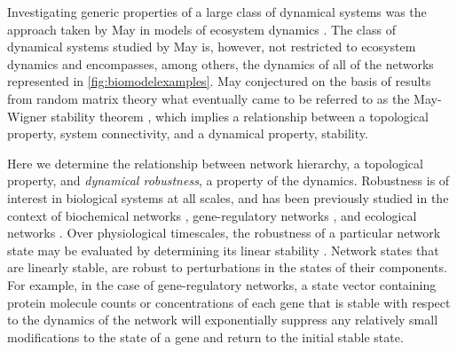 Investigating generic properties of a large class of dynamical systems was the approach taken by May in models of ecosystem dynamics \cite{Gardner1970,May1972}. The class of dynamical systems studied by May is, however, not restricted to ecosystem dynamics and encompasses, among others, the dynamics of all of the networks represented in \ref{fig:biomodelexamples}. May conjectured on the basis of results from random matrix theory what eventually came to be referred to as the May-Wigner stability theorem \cite{Cohen1984,May1972a,Radius2014,Majumdar2014}, which implies a relationship between a topological property, system connectivity, and a dynamical property, stability.


Here we determine the relationship between network hierarchy, a topological property, and \emph{dynamical robustness}, a property of the dynamics. Robustness is of interest in biological systems at all scales, and has been previously studied in the context of biochemical networks \cite{Alon1999,Shinar2010}, gene-regulatory networks \cite{VanNimwegen1999,Siegal2002,Draghi2010,Wagner2013}, and ecological networks \cite{Rohr2014}. Over physiological timescales, the robustness of a particular network state may be evaluated by determining its linear stability \cite{Davis1962}. Network states that are linearly stable, are robust to perturbations in the states of their components. For example, in the case of gene-regulatory networks, a state vector containing protein molecule counts or concentrations of each gene that is stable with respect to the dynamics of the network will exponentially suppress any relatively small modifications to the state of a gene and return to the initial stable state.

